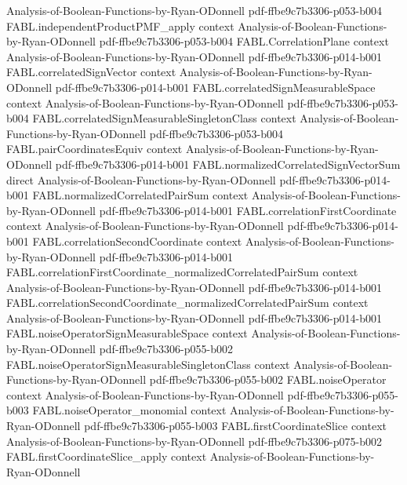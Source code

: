 \begin{theorem}
  {Analysis-of-Boolean-Functions-by-Ryan-ODonnell}
  {pdf-ffbe9c7b3306-p053-b004}
\proofstep
  {FABL.independentProductPMF_apply}
  {context}
  {Analysis-of-Boolean-Functions-by-Ryan-ODonnell}
  {pdf-ffbe9c7b3306-p053-b004}
\proofstep
  {FABL.CorrelationPlane}
  {context}
  {Analysis-of-Boolean-Functions-by-Ryan-ODonnell}
  {pdf-ffbe9c7b3306-p014-b001}
\proofstep
  {FABL.correlatedSignVector}
  {context}
  {Analysis-of-Boolean-Functions-by-Ryan-ODonnell}
  {pdf-ffbe9c7b3306-p014-b001}
\proofstep
  {FABL.correlatedSignMeasurableSpace}
  {context}
  {Analysis-of-Boolean-Functions-by-Ryan-ODonnell}
  {pdf-ffbe9c7b3306-p053-b004}
\proofstep
  {FABL.correlatedSignMeasurableSingletonClass}
  {context}
  {Analysis-of-Boolean-Functions-by-Ryan-ODonnell}
  {pdf-ffbe9c7b3306-p053-b004}
\proofstep
  {FABL.pairCoordinatesEquiv}
  {context}
  {Analysis-of-Boolean-Functions-by-Ryan-ODonnell}
  {pdf-ffbe9c7b3306-p014-b001}
\proofstep
  {FABL.normalizedCorrelatedSignVectorSum}
  {direct}
  {Analysis-of-Boolean-Functions-by-Ryan-ODonnell}
  {pdf-ffbe9c7b3306-p014-b001}
\proofstep
  {FABL.normalizedCorrelatedPairSum}
  {context}
  {Analysis-of-Boolean-Functions-by-Ryan-ODonnell}
  {pdf-ffbe9c7b3306-p014-b001}
\proofstep
  {FABL.correlationFirstCoordinate}
  {context}
  {Analysis-of-Boolean-Functions-by-Ryan-ODonnell}
  {pdf-ffbe9c7b3306-p014-b001}
\proofstep
  {FABL.correlationSecondCoordinate}
  {context}
  {Analysis-of-Boolean-Functions-by-Ryan-ODonnell}
  {pdf-ffbe9c7b3306-p014-b001}
\proofstep
  {FABL.correlationFirstCoordinate_normalizedCorrelatedPairSum}
  {context}
  {Analysis-of-Boolean-Functions-by-Ryan-ODonnell}
  {pdf-ffbe9c7b3306-p014-b001}
\proofstep
  {FABL.correlationSecondCoordinate_normalizedCorrelatedPairSum}
  {context}
  {Analysis-of-Boolean-Functions-by-Ryan-ODonnell}
  {pdf-ffbe9c7b3306-p014-b001}
\proofstep
  {FABL.noiseOperatorSignMeasurableSpace}
  {context}
  {Analysis-of-Boolean-Functions-by-Ryan-ODonnell}
  {pdf-ffbe9c7b3306-p055-b002}
\proofstep
  {FABL.noiseOperatorSignMeasurableSingletonClass}
  {context}
  {Analysis-of-Boolean-Functions-by-Ryan-ODonnell}
  {pdf-ffbe9c7b3306-p055-b002}
\proofstep
  {FABL.noiseOperator}
  {context}
  {Analysis-of-Boolean-Functions-by-Ryan-ODonnell}
  {pdf-ffbe9c7b3306-p055-b003}
\proofstep
  {FABL.noiseOperator_monomial}
  {context}
  {Analysis-of-Boolean-Functions-by-Ryan-ODonnell}
  {pdf-ffbe9c7b3306-p055-b003}
\proofstep
  {FABL.firstCoordinateSlice}
  {context}
  {Analysis-of-Boolean-Functions-by-Ryan-ODonnell}
  {pdf-ffbe9c7b3306-p075-b002}
\proofstep
  {FABL.firstCoordinateSlice_apply}
  {context}
  {Analysis-of-Boolean-Functions-by-Ryan-ODonnell}

\end{theorem}
